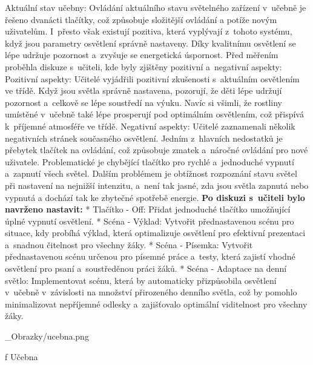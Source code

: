 \sec Aktuální stav učebny:
\medskip
Ovládání aktuálního stavu světelného zařízení v~učebně je řešeno dvanácti tlačítky, což způsobuje složitější ovládání
a potíže novým uživatelům. I~přesto však existují pozitiva, která vyplývají z~tohoto systému, když jsou parametry
osvětlení správně nastaveny. Díky kvalitnímu osvětlení se lépe udržuje pozornost a~zvyšuje se energetická úspornost.
\medskip
Před měřením proběhla diskuze s~učiteli, kde byly zjištěny pozitivní a~negativní aspekty:
\medskip
{\sbf Pozitivní aspekty:}
Učitelé vyjádřili pozitivní zkušenosti s~aktuálním osvětlením ve třídě. Když jsou světla správně nastavena,
pozorují, že děti lépe udržují pozornost a~celkově se lépe soustředí na výuku. Navíc si všimli, že rostliny
umístěné v~učebně také lépe prosperují pod optimálním osvětlením, což přispívá k~příjemné atmosféře ve třídě.
\medskip
{\sbf Negativní aspekty:}
Učitelé zaznamenali několik negativních stránek současného osvětlení. Jedním z~hlavních nedostatků je přebytek
tlačítek na ovládání, což způsobuje zmatek a~náročné ovládání pro nové uživatele. Problematické je chybějící
tlačítko pro rychlé a~jednoduché vypnutí a~zapnutí všech světel. Dalším problémem je obtížnost rozpoznání
stavu světel při nastavení na nejnižší intenzitu, a~není tak jasné, zda jsou světla zapnutá nebo vypnutá
a dochází tak ke zbytečné spotřebě energie.
\medskip
{\bf Po diskuzi s~učiteli bylo navrženo nastavit:}
\medskip
\begitems
    * {\sbf Tlačítko - Off:} Přidat jednoduché tlačítko umožňující úplné vypnutí osvětlení.
\medskip
    * {\sbf Scéna - Výklad:} Vytvořit přednastavenou scénu pro situace, kdy probíhá výklad, která optimalizuje
    osvětlení pro efektivní prezentaci a~snadnou čitelnost pro všechny žáky.
\medskip
    * {\sbf Scéna - Písemka:} Vytvořit přednastavenou scénu určenou pro písemné práce a~testy, která
    zajistí vhodné osvětlení pro psaní a~soustředěnou práci žáků.
\medskip
    * {\sbf Scéna - Adaptace na denní světlo:} Implementovat scénu, která by automaticky přizpůsobila
    osvětlení v~učebně v~závislosti na množství přirozeného denního světla, což by pomohlo minimalizovat
    nepříjemné odlesky a~zajišťovalo optimální viditelnost pro všechny žáky.
\enditems

\medskip {}
\picw=15cm _Obrazky/ucebna.png
\caption/f Učebna
\medskip








